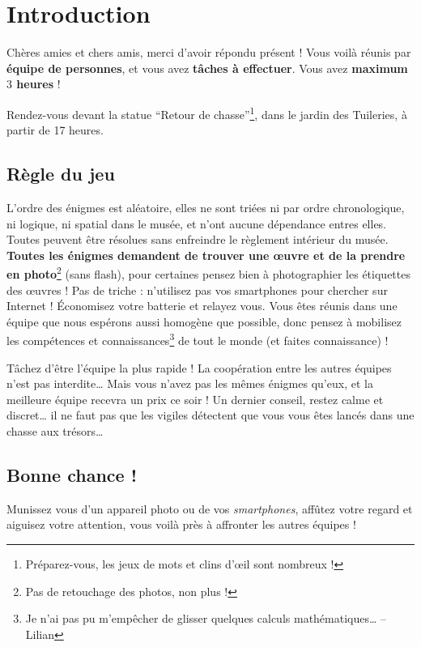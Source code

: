 \chapter{Introduction}

\vspace*{-30pt}

Chères amies et chers amis, merci d'avoir répondu présent !
%
Vous voilà réunis par \textbf{équipe de \nbparequipe{} personnes},
et vous avez \textbf{\nbenigmes{} tâches à effectuer}.
%
Vous avez \textbf{maximum $3$ heures} !

Rendez-vous devant la statue ``Retour de chasse''\footnote{Préparez-vous, les jeux de mots et clins d'œil sont nombreux !}, dans le jardin des Tuileries, à partir de 17 heures.


\section*{Règle du jeu}

L'ordre des énigmes est aléatoire, elles ne sont triées ni par ordre chronologique, ni logique, ni spatial dans le musée, et n'ont aucune dépendance entres elles.
%
Toutes peuvent être résolues sans enfreindre le règlement intérieur du musée.
\textbf{Toutes les énigmes demandent de trouver une œuvre et de la prendre en photo}\footnote{Pas de retouchage des photos, non plus !} (sans flash), pour certaines pensez bien à photographier les étiquettes des œuvres !
Pas de triche : n'utilisez pas vos smartphones pour chercher sur Internet !
Économisez votre batterie et relayez vous.
%
Vous êtes réunis dans une équipe que nous espérons aussi homogène que possible, donc pensez à mobilisez les compétences et connaissances\footnote{Je n'ai pas pu m'empêcher de glisser quelques calculs mathématiques… -- Lilian} de tout le monde (et faites connaissance) !

Tâchez d'être l'équipe la plus rapide ! La coopération entre les autres équipes n'est pas interdite…
Mais vous n'avez pas les mêmes énigmes qu'eux, et la meilleure équipe recevra un prix ce soir !
%
Un dernier conseil, restez calme et discret… il ne faut pas que les vigiles détectent que vous vous êtes lancés dans une chasse aux trésors…


\section*{Bonne chance !}
Munissez vous d'un appareil photo ou de vos \emph{smartphones}, affûtez votre regard et aiguisez votre attention, vous voilà près à affronter les autres équipes !
